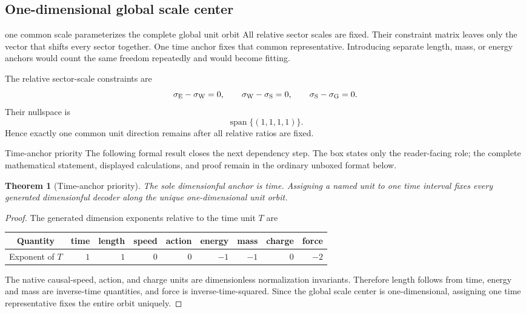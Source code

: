 \documentclass[11pt]{article}
\numberwithin{equation}{section}
\newtheorem{theorem}[definition]{Theorem}
\theoremstyle{remark}
\begin{document}
\label{sec:units}

\subsection{One-dimensional global scale center}
\begin{interpretivebridge}{one common scale parameterizes the complete global unit orbit}
All relative sector scales are fixed. Their constraint matrix leaves only the vector that shifts every sector together. One time anchor fixes that common representative. Introducing separate length, mass, or energy anchors would count the same freedom repeatedly and would become fitting.
\end{interpretivebridge}

The relative sector-scale constraints are
\begin{equation}
\sigma_{\rm E}-\sigma_{\rm W}=0,
\qquad
\sigma_{\rm W}-\sigma_{\rm S}=0,
\qquad
\sigma_{\rm S}-\sigma_{\rm G}=0.
\end{equation}
Their nullspace is
\begin{equation}
\operatorname{span}\{(1,1,1,1)\}.
\end{equation}
Hence exactly one common unit direction remains after all relative ratios are fixed.

\begin{proofguide}{Time-anchor priority}
The following formal result closes the next dependency step. The box states only the reader-facing role; the complete mathematical statement, displayed calculations, and proof remain in the ordinary unboxed format below.
\end{proofguide}
\begin{theorem}[Time-anchor priority]
The sole dimensionful anchor is time. Assigning a named unit to one time interval fixes every generated dimensionful decoder along the unique one-dimensional unit orbit.
\end{theorem}

\begin{proof}
The generated dimension exponents relative to the time unit $T$ are
\begin{center}
\begin{tabular}{c|rrrrrrrr}
\toprule
Quantity & time & length & speed & action & energy & mass & charge & force\\
\midrule
Exponent of $T$ & $1$ & $1$ & $0$ & $0$ & $-1$ & $-1$ & $0$ & $-2$\\
\bottomrule
\end{tabular}
\end{center}
The native causal-speed, action, and charge units are dimensionless normalization invariants. Therefore length follows from time, energy and mass are inverse-time quantities, and force is inverse-time-squared. Since the global scale center is one-dimensional, assigning one time representative fixes the entire orbit uniquely.
\end{proof}
\end{document}
